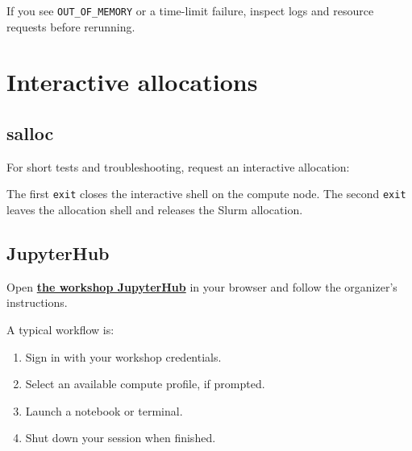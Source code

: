 \documentclass[
]{book}
\newenvironment{Shaded}{\begin{snugshade}}{\end{snugshade}}
\newcommand{\AttributeTok}[1]{\textcolor[rgb]{0.13,0.29,0.53}{#1}}
\newcommand{\BuiltInTok}[1]{#1}
\newcommand{\CommentTok}[1]{\textcolor[rgb]{0.56,0.35,0.01}{\textit{#1}}}
\newcommand{\ExtensionTok}[1]{#1}
\newcommand{\FunctionTok}[1]{\textcolor[rgb]{0.13,0.29,0.53}{\textbf{#1}}}
\newcommand{\NormalTok}[1]{#1}
\newcommand{\OperatorTok}[1]{\textcolor[rgb]{0.81,0.36,0.00}{\textbf{#1}}}
\newcommand{\VariableTok}[1]{\textcolor[rgb]{0.00,0.00,0.00}{#1}}
\providecommand{\tightlist}{%
  \setlength{\itemsep}{0pt}\setlength{\parskip}{0pt}}
\begin{document}
If you see \texttt{OUT\_OF\_MEMORY} or a time-limit failure, inspect logs and resource requests before rerunning.

\section{Interactive allocations}\label{interactive-allocations}

\subsection{salloc}\label{salloc}

For short tests and troubleshooting, request an interactive allocation:

\begin{Shaded}
\end{Shaded}

The first \texttt{exit} closes the interactive shell on the compute node. The second \texttt{exit} leaves the allocation shell and releases the Slurm allocation.

\subsection{JupyterHub}\label{jupyterhub}

Open \textbf{\href{https://jupyter.cbw.c3.ca}{the workshop JupyterHub}} in your browser and follow the organizer's instructions.

A typical workflow is:

\begin{enumerate}
\def\labelenumi{\arabic{enumi}.}
\tightlist
\item
  Sign in with your workshop credentials.
\item
  Select an available compute profile, if prompted.
\item
  Launch a notebook or terminal.
\item
  Shut down your session when finished.
\end{enumerate}
\end{document}
